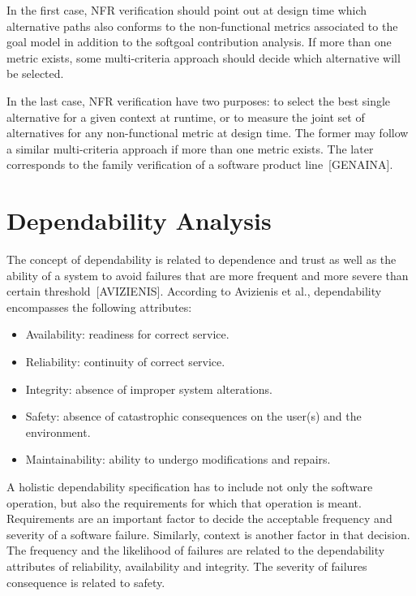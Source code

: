 In the first case, NFR verification should point out at design time which alternative paths also conforms to the non-functional metrics associated to the goal model in addition to the softgoal contribution analysis. If more than one metric exists, some multi-criteria approach should decide which alternative will be selected. 

In the last case, NFR verification have two purposes: to select the best single alternative for a given context at runtime, or to measure the joint set of alternatives for any non-functional metric at design time. The former may follow a similar multi-criteria approach if more than one metric exists. The later corresponds to the family verification of a software product line~[GENAINA].

\section{Dependability Analysis}

The concept of dependability is related to dependence and trust as well as the ability of a system to avoid failures that are more frequent and more severe than certain threshold~[AVIZIENIS]. According to Avizienis et al., dependability encompasses the following attributes: 

\begin{itemize}

\item Availability: readiness for correct service.
\medskip

\item Reliability: continuity of correct service.
\medskip

\item Integrity: absence of improper system alterations.
\medskip

\item Safety: absence of catastrophic consequences on the user(s) and the environment.
\medskip

\item Maintainability: ability to undergo modifications and repairs.
\medskip

\end{itemize}


A holistic dependability specification has to include not only the software operation, but also the requirements for which that operation is meant. Requirements are an important factor to decide the acceptable frequency and severity of a software failure. Similarly, context is another factor in that decision. The frequency and the likelihood of failures are related to the dependability attributes of reliability, availability and integrity. The severity of failures consequence is related to safety.

